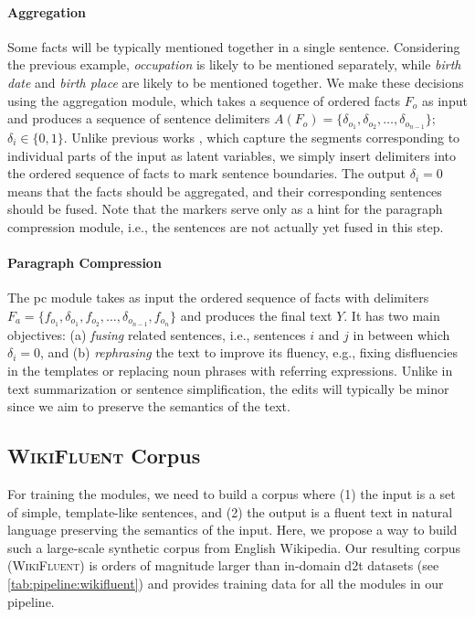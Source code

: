 \paragraph{Aggregation} Some facts will be typically mentioned together in a single sentence. Considering the previous example, \textit{occupation} is likely to be mentioned separately, while \textit{birth date} and \textit{birth place} are likely to be mentioned together. We make these decisions using the aggregation module, which takes a sequence of ordered facts $F_o$ as input and produces a sequence of sentence delimiters $A(F_o) = \{\delta_{o_1}, \delta_{o_2}, \ldots, \delta_{o_{n-1}}\}$; $\delta_{i} \in \{0, 1\}$.
Unlike previous works \cite{wiseman2018learning,shao-etal-2019-long,shen-etal-2020-neural,xuAGGGENOrderingAggregating2021}, which capture the segments corresponding to individual parts of the input as latent variables, we simply insert delimiters into the ordered sequence of facts to mark sentence boundaries. The output $\delta_{i}=0$ means that the facts should be aggregated, and their corresponding sentences should be fused. Note that the markers serve only as a hint for the paragraph compression module, i.e., the sentences are not actually yet fused in this step.



\paragraph{Paragraph Compression}  The \ac{pc} module takes as input the ordered sequence of facts with delimiters $F_a = \{f_{o_1}, \delta_{o_1}, f_{o_2}, \ldots, \delta_{o_{n-1}}, f_{o_n}\}$ and produces the final text $Y$.  It has two main objectives: (a) \textit{fusing} related sentences, i.e., sentences $i$ and $j$ in between which $\delta_{i}=0$, and (b) \textit{rephrasing} the text to improve its fluency, e.g., fixing disfluencies in the templates or replacing noun phrases with referring expressions. Unlike in text summarization or sentence simplification, the edits will typically be minor since we aim to preserve the semantics of the text.



\subsection{\textsc{WikiFluent} Corpus}
\label{sec:pipeline:wikifluent}
For training the modules, we need to build a corpus where (1) the input is a set of simple, template-like sentences, and (2) the output is a fluent text in natural language preserving the semantics of the input. Here, we propose a way to build such a large-scale synthetic corpus from English Wikipedia. Our resulting corpus (\textsc{WikiFluent}) is orders of magnitude larger than in-domain \ac{d2t} datasets (see \autoref{tab:pipeline:wikifluent}) and provides training data for all the modules in our pipeline.


